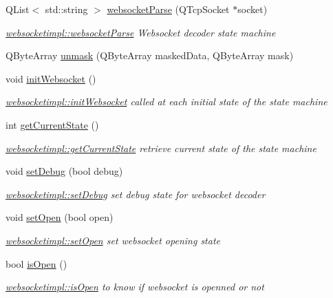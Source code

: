 \begin{DoxyCompactItemize}
\item 
Q\-List$<$ std\-::string $>$ \hyperlink{classwebsocketimpl_a5ec440436383328244050d25afdf7ed6}{websocket\-Parse} (Q\-Tcp\-Socket $\ast$socket)
\begin{DoxyCompactList}\small\item\em \hyperlink{classwebsocketimpl_ae5ae4cafabbff7ed2fab292e4ed1daf3}{websocketimpl\-::websocket\-Parse} Websocket decoder state machine \end{DoxyCompactList}\item 
Q\-Byte\-Array \hyperlink{classwebsocketimpl_a796980528878c5d6279c96aa95ccefcb}{unmask} (Q\-Byte\-Array masked\-Data, Q\-Byte\-Array mask)
\item 
\hypertarget{classwebsocketimpl_a67fa07befa5af268b8f035ae4d33cd55}{void \hyperlink{classwebsocketimpl_a67fa07befa5af268b8f035ae4d33cd55}{init\-Websocket} ()}\label{classwebsocketimpl_a67fa07befa5af268b8f035ae4d33cd55}

\begin{DoxyCompactList}\small\item\em \hyperlink{classwebsocketimpl_a67fa07befa5af268b8f035ae4d33cd55}{websocketimpl\-::init\-Websocket} called at each initial state of the state machine \end{DoxyCompactList}\item 
int \hyperlink{classwebsocketimpl_ad2c9ac95e4498257c9d19bca9f509777}{get\-Current\-State} ()
\begin{DoxyCompactList}\small\item\em \hyperlink{classwebsocketimpl_ad2c9ac95e4498257c9d19bca9f509777}{websocketimpl\-::get\-Current\-State} retrieve current state of the state machine \end{DoxyCompactList}\item 
void \hyperlink{classwebsocketimpl_a237efd210f7648c903f3044c1a8ff0c9}{set\-Debug} (bool debug)
\begin{DoxyCompactList}\small\item\em \hyperlink{classwebsocketimpl_a237efd210f7648c903f3044c1a8ff0c9}{websocketimpl\-::set\-Debug} set debug state for websocket decoder \end{DoxyCompactList}\item 
void \hyperlink{classwebsocketimpl_a6218fa898318685fc634da3931a6a879}{set\-Open} (bool open)
\begin{DoxyCompactList}\small\item\em \hyperlink{classwebsocketimpl_a6218fa898318685fc634da3931a6a879}{websocketimpl\-::set\-Open} set websocket opening state \end{DoxyCompactList}\item 
bool \hyperlink{classwebsocketimpl_a19c16ec206b8ca8f61720355defb65bc}{is\-Open} ()
\begin{DoxyCompactList}\small\item\em \hyperlink{classwebsocketimpl_a19c16ec206b8ca8f61720355defb65bc}{websocketimpl\-::is\-Open} to know if websocket is openned or not \end{DoxyCompactList}\end{DoxyCompactItemize}


